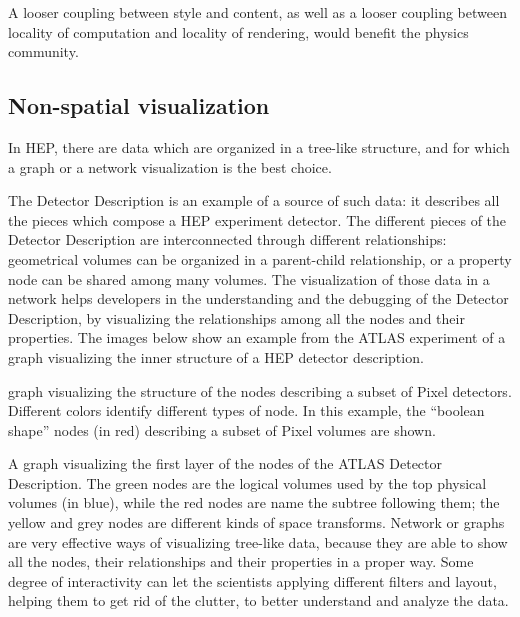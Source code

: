 \documentclass[12pt,a4paper]{article}
\begin{document}
A looser coupling between style and content, as well as a looser coupling between locality of computation and locality of rendering,
would benefit the physics community.


\hypertarget{non-spatial-visualization}{%
\subsection{Non-spatial visualization}\label{non-spatial-visualization}}

In HEP, there are data which are organized in a tree-like structure, and for which a graph or a network visualization is the best choice.

The Detector Description is an example of a source of such data: it describes all the pieces which compose a HEP experiment detector.
The different pieces of the Detector Description are interconnected through different relationships: geometrical volumes can be organized
in a parent-child relationship, or a property node can be shared among many volumes. The visualization of those data in a network helps
developers in the understanding and the debugging of the Detector Description, by visualizing the relationships among all the nodes and
their properties. The images below show an example from the ATLAS experiment \cite{ATLASGeoModel2017} of a graph visualizing the inner structure of a HEP detector description.



graph visualizing the structure of the nodes describing a subset of Pixel detectors. Different colors identify different types of node. In this example, the “boolean shape” nodes (in red) describing a subset of Pixel volumes are shown.



A graph visualizing the first layer of the nodes of the ATLAS Detector Description. The green nodes are the logical volumes used by the top physical volumes (in blue), while the red nodes are name the subtree following them; the yellow and grey nodes are different kinds of space transforms. Network or graphs are very effective ways of visualizing tree-like data, because they are able to show all the 	nodes, their relationships and their properties in a proper way. Some degree of interactivity can let the scientists applying different filters and layout, helping them to get rid of the clutter, to better understand and analyze the data.
\end{document}
